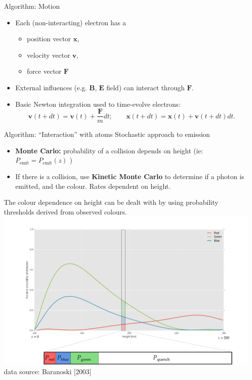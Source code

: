 \documentclass[xcolor=pdftex,dvipsnames,table,usenames,11pt]{beamer}
\newcommand{\sub}[1]{\ensuremath{_\mathrm{#1}}}
\renewcommand{\vec}[1]{\ensuremath{\mathbf{#1}}}
\begin{document}
\begin{frame}{Algorithm: Motion}
\begin{itemize}
\item Each (non-interacting) electron has a 
\begin{itemize}
\item position vector $\vec x$,
\item velocity vector $\vec v$,
\item force vector $\vec F$
\end{itemize}
\item External influences (e.g. \vec B, \vec E field) can interact through $\vec F$.
\pause
\item Basic Newton integration used to time-evolve electrons:
\begin{equation*}
\vec v (t + dt) = \vec v(t) + \frac{\vec F}{m} dt; \qquad \vec x(t + dt) = \vec x (t)  + \vec v(t+dt) dt .  
\end{equation*}
\end{itemize}
\end{frame}














\begin{frame}{Algorithm: ``Interaction'' with atoms}
Stochastic approach to emission
\begin{itemize}
\item \textbf{Monte Carlo:} probability of a collision depends on height (ie: $P\sub{emit} = P\sub{emit}(z)$ )
\item If there is a collision, use \textbf{Kinetic Monte Carlo} to determine if a photon is emitted, and the colour. Rates dependent on height.
\end{itemize}
\end{frame}




\begin{frame}
The colour dependence on height can be dealt with by using probability thresholds derived from observed colours.
\includegraphics[width=\textwidth]{img/Earth_color_probs.pdf}\\
{\hfill \tiny data source: Baranoski [2003] }
\end{frame}
\end{document}
